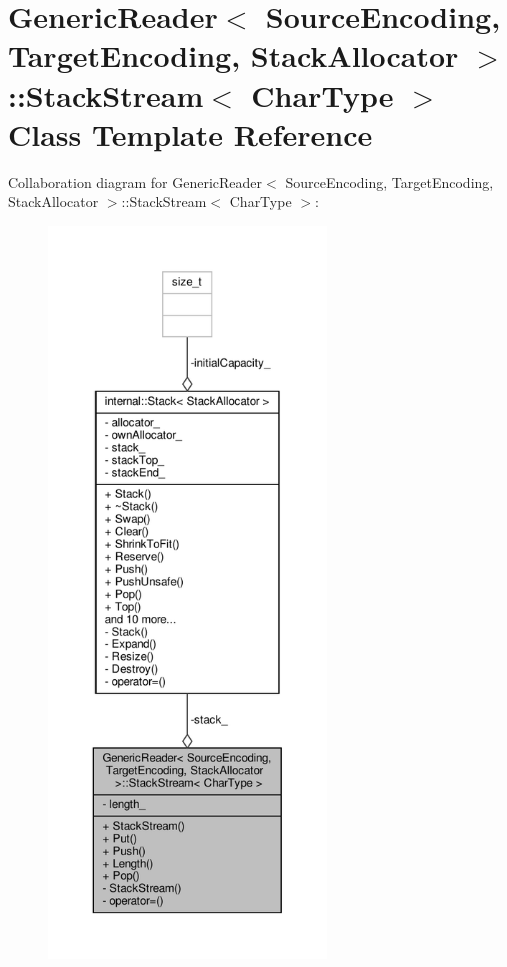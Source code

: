 \hypertarget{classGenericReader_1_1StackStream}{}\section{Generic\+Reader$<$ Source\+Encoding, Target\+Encoding, Stack\+Allocator $>$\+:\+:Stack\+Stream$<$ Char\+Type $>$ Class Template Reference}
\label{classGenericReader_1_1StackStream}


Collaboration diagram for Generic\+Reader$<$ Source\+Encoding, Target\+Encoding, Stack\+Allocator $>$\+:\+:Stack\+Stream$<$ Char\+Type $>$\+:
\nopagebreak
\begin{figure}[H]
\begin{center}
\leavevmode
\includegraphics[height=550pt]{classGenericReader_1_1StackStream__coll__graph}
\end{center}
\end{figure}
